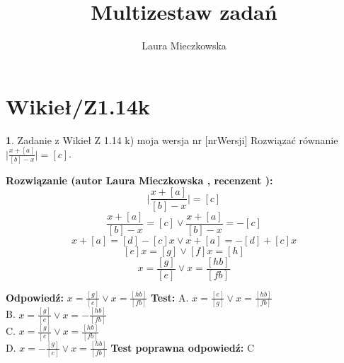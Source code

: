 \documentclass[12pt, a4paper]{article}
\title{Multizestaw zadań}
\author{Laura Mieczkowska}
\date{}
\theoremstyle{definition} %
\newtheorem{zad}{}
\newcommand{\kategoria}[1]{\section{#1}} %
\newcommand{\zadStart}[1]{\begin{zad}#1\newline} %
\newcommand{\zadStop}{\end{zad}}   %
\newcommand{\rozwStart}[2]{\noindent \textbf{Rozwiązanie (autor #1 , recenzent #2): }\newline} %
\newcommand{\odpStart}{\noindent \textbf{Odpowiedź:}\newline}    %
\newcommand{\odpStop}{\newline}                                             %
\newcommand{\testStart}{\noindent \textbf{Test:}\newline} %
\newcommand{\testStop}{\newline} %
\newcommand{\kluczStart}{\noindent \textbf{Test poprawna odpowiedź:}\newline} %
\newcommand{\kluczStop}{\newline} %
\begin{document}
\maketitle


\kategoria{Wikieł/Z1.14k}
\zadStart{Zadanie z Wikieł Z 1.14 k) moja wersja nr [nrWersji]}
Rozwiązać równanie $\big|\frac{x+[a]}{[b]-x}\big|=[c]$.
\zadStop
\rozwStart{Laura Mieczkowska}{}
$$\bigg|\frac{x+[a]}{[b]-x}\bigg|=[c]$$ 
$$\frac{x+[a]}{[b]-x}=[c] \vee \frac{x+[a]}{[b]-x}=-[c]$$
$$x+[a]=[d]-[c]x \vee x+[a]=-[d]+[c]x$$
$$[e]x=[g] \vee [f]x=[h]$$
$$x=\frac{[g]}{[e]} \vee x=\frac{[hb]}{[fb]}$$

\odpStart
$x=\frac{[g]}{[e]} \vee x=\frac{[hb]}{[fb]}$
\odpStop
\testStart
A. $x=\frac{[e]}{[g]} \vee x=\frac{[hb]}{[fb]}$ \\
B. $x=\frac{[g]}{[e]} \vee x=-\frac{[hb]}{[fb]}$ \\
C. $x=\frac{[g]}{[e]} \vee x=\frac{[hb]}{[fb]}$ \\
D. $x=-\frac{[g]}{[e]} \vee x=\frac{[hb]}{[fb]}$ 
\testStop
\kluczStart
C
\kluczStop
\end{document}
